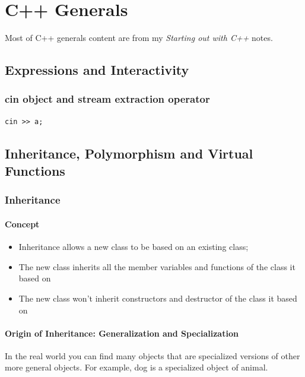 \documentclass[11pt]{book}
\date{\today}
\title{}
\begin{document}
\tableofcontents


\part{C++ Generals}
\label{sec:orgfeb6c32}
Most of C++ generals content are from my \emph{Starting out with C++} notes. 

\chapter{Expressions and Interactivity}
\label{sec:org106d664}

\section{cin object and stream extraction operator}
\label{sec:org825d668}
\begin{verbatim}
cin >> a;
\end{verbatim}

\chapter{Inheritance, Polymorphism and Virtual Functions}
\label{sec:org11548ce}
\section{Inheritance}
\label{sec:org3e2c37e}
\subsection{Concept}
\label{sec:orga43abd6}
\begin{itemize}
\item Inheritance allows a new class to be based on an existing class;
\item The new class inherits all the member variables and functions of the class it based on
\item The new class won't inherit constructors and destructor of the class it based on
\end{itemize}

\subsection{Origin of Inheritance: Generalization and Specialization}
\label{sec:org73812aa}
In the real world you can find many objects that are specialized versions of other more general objects. For example, dog is a specialized object of animal.
\end{document}
